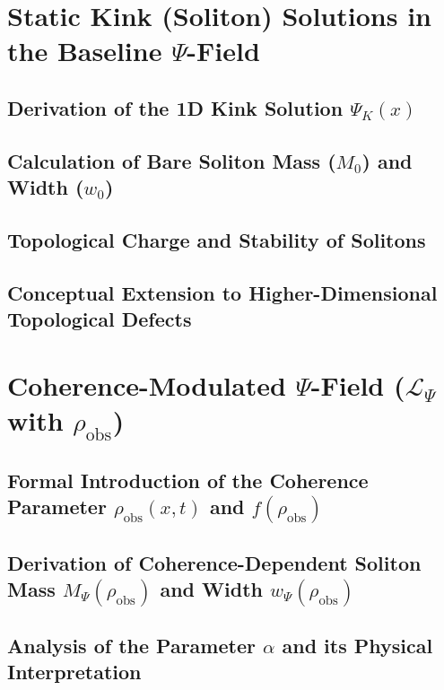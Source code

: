 \documentclass{report}
\begin{document}
    \section{Static Kink (Soliton) Solutions in the Baseline $\Psi$-Field}
    \label{app_sec:static_kink_solutions}
        \subsection{Derivation of the 1D Kink Solution $\Psi_K(x)$}
        \label{app_subsec:deriv_1d_kink}
        \subsection{Calculation of Bare Soliton Mass ($M_0$) and Width ($w_0$)}
        \label{app_subsec:calc_bare_soliton_mass_width}
        \subsection{Topological Charge and Stability of Solitons}
        \label{app_subsec:topological_charge_stability}
        \subsection{Conceptual Extension to Higher-Dimensional Topological Defects}
        \label{app_subsec:higher_dim_topological_defects}

    \section{Coherence-Modulated $\Psi$-Field ($\mathcal{L}_{\Psi}$ with $\rho_{\text{obs}}$)}
    \label{app_sec:coherence_modulated_psi_field}
        \subsection{Formal Introduction of the Coherence Parameter $\rho_{\text{obs}}(x,t)$ and $f(\rho_{\text{obs}})$}
        \label{app_subsec:formal_intro_coherence_param}
        \subsection{Derivation of Coherence-Dependent Soliton Mass $M_{\Psi}(\rho_{\text{obs}})$ and Width $w_{\Psi}(\rho_{\text{obs}})$}
        \label{app_subsec:deriv_coherence_dep_soliton_mass_width}
        \subsection{Analysis of the Parameter $\alpha$ and its Physical Interpretation}
        \label{app_subsec:analysis_alpha_param}
\end{document}
